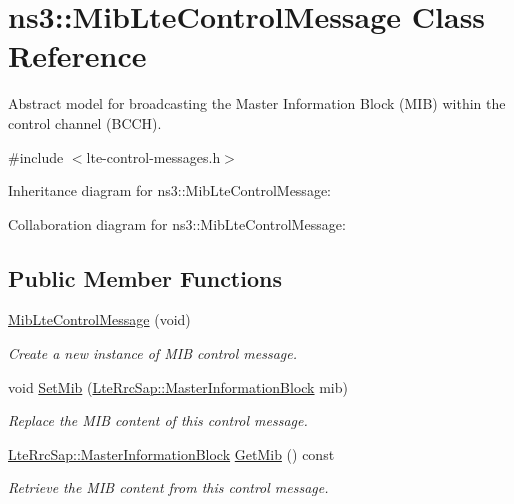 \hypertarget{classns3_1_1MibLteControlMessage}{}\section{ns3\+:\+:Mib\+Lte\+Control\+Message Class Reference}
\label{classns3_1_1MibLteControlMessage}


Abstract model for broadcasting the Master Information Block (M\+IB) within the control channel (B\+C\+CH).  




{\ttfamily \#include $<$lte-\/control-\/messages.\+h$>$}



Inheritance diagram for ns3\+:\+:Mib\+Lte\+Control\+Message\+:


Collaboration diagram for ns3\+:\+:Mib\+Lte\+Control\+Message\+:
\subsection*{Public Member Functions}
\begin{DoxyCompactItemize}
\item 
\hyperlink{classns3_1_1MibLteControlMessage_ac48bb2e6836ea65228e5608c78ebbc1d}{Mib\+Lte\+Control\+Message} (void)
\begin{DoxyCompactList}\small\item\em Create a new instance of M\+IB control message. \end{DoxyCompactList}\item 
void \hyperlink{classns3_1_1MibLteControlMessage_a448bc765bc00dd872524a13b83c4f3d4}{Set\+Mib} (\hyperlink{structns3_1_1LteRrcSap_1_1MasterInformationBlock}{Lte\+Rrc\+Sap\+::\+Master\+Information\+Block} mib)
\begin{DoxyCompactList}\small\item\em Replace the M\+IB content of this control message. \end{DoxyCompactList}\item 
\hyperlink{structns3_1_1LteRrcSap_1_1MasterInformationBlock}{Lte\+Rrc\+Sap\+::\+Master\+Information\+Block} \hyperlink{classns3_1_1MibLteControlMessage_a20ddaabc27b9244c3225fc98e5a517a5}{Get\+Mib} () const 
\begin{DoxyCompactList}\small\item\em Retrieve the M\+IB content from this control message. \end{DoxyCompactList}\end{DoxyCompactItemize}
